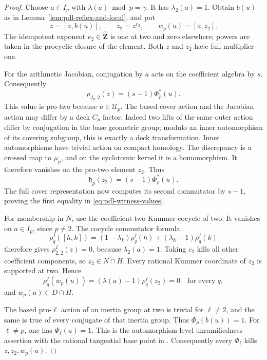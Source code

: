 \begin{proof}
Choose \(a\in I_p\) with \(\lambda(a)\bmod p=\gamma\).
It has \(\lambda_2(a)=1\). Obtain \(b(u)\) as in
Lemma~\ref{lem:pdl-reflex-and-local}, and put
\[
                  z=[a,b(u)],\qquad z_2=z^{e_2},
                         \qquad w_p(u)=[a,z_2].
\]
The idempotent exponent \(e_2\in\widehat{\mathbf Z}\)
is one at two and zero elsewhere; powers are taken in
the procyclic closure of the element. Both \(z\) and
\(z_2\) have full multiplier one.

For the arithmetic Jacobian, conjugation by \(a\) acts
on the coefficient algebra by \(s\). Consequently
\[
                    \rho_{J_p,2}(z)=(s-1)\Phi_p^*(u).
\]
This value is pro-two because \(u\in\mathcal U_p\).
The based-cover action and the Jacobian action may differ
by a deck \(C_p\) factor. Indeed two lifts of the same
outer action differ by conjugation in the base geometric
group; modulo an inner automorphism of its covering
subgroup, this is exactly a deck transformation. Inner
automorphisms have trivial action on compact homology.
The discrepancy is a crossed map to \(\mu_p\), and
on the cyclotomic kernel it is a homomorphism.
It therefore vanishes on the pro-two element \(z_2\).
Thus
\[
                    \mathfrak h_p(z_2)=(s-1)\Phi_p^*(u).
\]
The full cover representation now computes its second
commutator by \(s-1\), proving the first equality in
\eqref{eq:pdl-witness-values}.

For membership in \(N\), use the coefficient-two Kummer
cocycle of two. It vanishes on \(a\in I_p\), since
\(p\ne2\). The cocycle commutator formula
\[
 \rho_q^I([h,k])=(1-\lambda_k)\rho_q^I(h)
                              +(\lambda_h-1)\rho_q^I(k)
\]
therefore gives \(\rho_{2,2}^I(z)=0\), because
\(\lambda_2(a)=1\). Taking \(e_2\) kills all other
coefficient components, so \(z_2\in N\cap H\).
Every rational Kummer coordinate of \(z_2\) is supported
at two. Hence
\[
                \rho_q^I(w_p(u))
                   =(\lambda(a)-1)\rho_q^I(z_2)=0
                           \quad\text{for every }q,
\]
and \(w_p(u)\in D\cap H\).

The based pro-\(\ell\) action of an inertia group
at two is trivial for \(\ell\ne2\), and the same is
true of every conjugate of that inertia group.
Thus \(\Phi_p(b(u))=1\). For \(\ell\ne p\), one
has \(\Phi_\ell(a)=1\). This is the automorphism-level
unramifiedness assertion with the rational tangential
base point in \cite[\S8.5, pp.~151--152]{HainMatsumoto2003}.
Consequently every \(\Phi_\ell\) kills \(z,z_2,w_p(u)\).


\end{proof}
